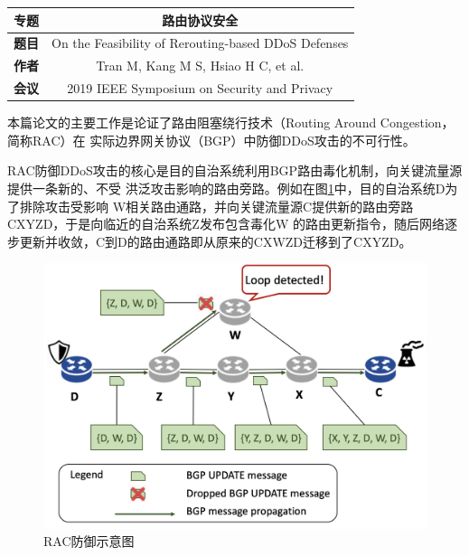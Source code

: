 \documentclass[a4paper]{article}
\begin{document}
\courseheader
{}

\info


  
\vspace{-15pt}
\begin{center}
  \begin{tabular}{c|c} \toprule
    \textbf{专题} &路由协议安全 \\\midrule
    \textbf{题目} &On the Feasibility of Rerouting-based DDoS Defenses\\
    \textbf{作者} &Tran M, Kang M S, Hsiao H C, et al. \\
    \textbf{会议} &2019 IEEE Symposium on Security and Privacy \\\bottomrule
  \end{tabular}
\end{center}
  
\vspace{20pt}
\setlength{\parindent}{2em}

本篇论文的主要工作是论证了路由阻塞绕行技术（Routing Around Congestion，简称RAC）在
实际边界网关协议（BGP）中防御DDoS攻击的不可行性。

RAC防御DDoS攻击的核心是目的自治系统利用BGP路由毒化机制，向关键流量源提供一条新的、不受
洪泛攻击影响的路由旁路。例如在图\ref{fig:Denfense}中，目的自治系统D为了排除攻击受影响
W相关路由通路，并向关键流量源C提供新的路由旁路CXYZD，于是向临近的自治系统Z发布包含毒化W
的路由更新指令，随后网络逐步更新并收敛，C到D的路由通路即从原来的CXWZD迁移到了CXYZD。

\begin{figure}[h]\centering
  \includegraphics[scale=0.25]{figures/Defense.png}
  \caption{RAC防御示意图}
  \label{fig:Denfense}
\end{figure}
\end{document}
